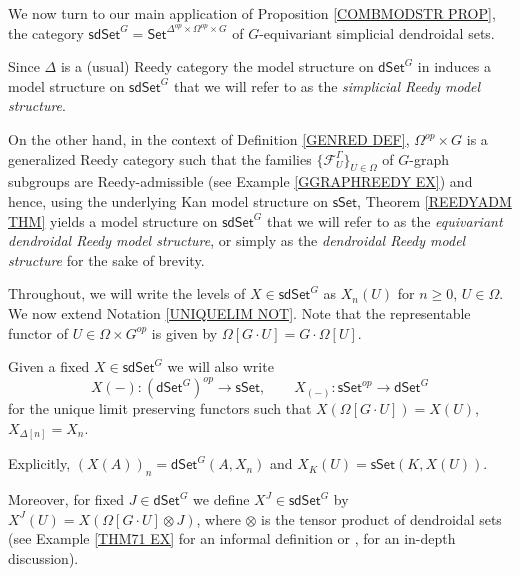 \documentclass[a4paper,10pt
 ,draft
]{article}%
\begin{document}
We now turn to our main application of Proposition \ref{COMBMODSTR PROP}, the category 
$\mathsf{sdSet}^G = \mathsf{Set}^{\Delta^{op} \times \Omega^{op} \times G}$
of $G$-equivariant simplicial dendroidal sets.

Since $\Delta$ is a (usual) Reedy category the model structure on $\mathsf{dSet}^G$ 
in \cite[Thm. 2.1]{Per18} induces 
a model structure on $\mathsf{sdSet}^G$
that we will refer to as the \textit{simplicial Reedy model structure}.

On the other hand, in the context of Definition \ref{GENRED DEF},
$\Omega^{op} \times G$ is a generalized Reedy category such that the families $\{\mathcal{F}_{U}^{\Gamma}\}_{U \in \Omega}$
of $G$-graph subgroups are Reedy-admissible 
(see Example \ref{GGRAPHREEDY EX})
and hence, using the underlying 
Kan model structure on $\mathsf{sSet}$, 
Theorem \ref{REEDYADM THM} yields
a model structure on $\mathsf{sdSet}^G$
that we will refer to as the \textit{equivariant dendroidal Reedy model structure}, 
or simply as the \textit{dendroidal Reedy model structure} for the sake of brevity.

Throughout, we will write the levels of 
$X \in \mathsf{sdSet}^G$ as 
$X_n(U)$ for $n\geq 0$, $U \in \Omega$.
We now extend Notation \ref{UNIQUELIM NOT}.
Note that the representable functor of
$U \in \Omega \times G^{op}$ is given by $\Omega[G \cdot U] = G \cdot \Omega[U]$.

\begin{notation}\label{UNILIMDEN NOT}
	Given a fixed $X \in \mathsf{sdSet}^G$ we will also write
\[
	X(-)\colon \left(\mathsf{dSet}^G \right)^{op} \to \mathsf{sSet},\qquad 
	X_{(-)} \colon \mathsf{sSet}^{op} \to \mathsf{dSet}^{G}
\]
	for the unique limit preserving functors such that
	$X(\Omega[G \cdot U]) = X(U)$, $X_{\Delta[n]} = X_n$.
	
	Explicitly, $\left(X(A)\right)_n = \mathsf{dSet}^G(A,X_n)$
	and $X_K(U) = \mathsf{sSet}(K,X(U))$.
%    
  
Moreover,
for fixed $J \in \mathsf{dSet}^{G}$
we define $X^J \in \mathsf{sdSet}^G$ by 
$X^J(U) = X(\Omega[G\cdot U] \otimes J)$,
	where $\otimes$ is the tensor product of dendroidal sets (see Example \ref{THM71 EX} for an informal definition or \cite[\S 9]{MW09},\cite[\S 7]{Per18} for an in-depth discussion).
\end{notation}
\end{document}
